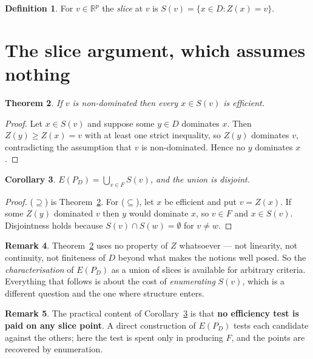 \documentclass[11pt,a4paper]{article}
\newcommand{\Dset}{D}
\newcommand{\E}{E(P_{\Dset})}
\newcommand{\Z}{Z}
\newcommand{\R}{\mathbb{R}}
\theoremstyle{plain}
\newtheorem{theorem}{Theorem}
\newtheorem{corollary}[theorem]{Corollary}
\theoremstyle{definition}
\newtheorem{definition}[theorem]{Definition}
\newtheorem{remark}[theorem]{Remark}
\begin{document}
\begin{definition}
For $v \in \R^p$ the \emph{slice} at $v$ is
$S(v) = \{x \in \Dset : \Z(x) = v\}$.
\end{definition}

\section{The slice argument, which assumes nothing}

\begin{theorem}\label{th:slice}
If $v$ is non-dominated then every $x \in S(v)$ is efficient.
\end{theorem}

\begin{proof}
Let $x \in S(v)$ and suppose some $y \in \Dset$ dominates $x$.  Then
$\Z(y) \geqslant \Z(x) = v$ with at least one strict inequality, so $\Z(y)$
dominates $v$, contradicting the assumption that $v$ is non-dominated.  Hence
no $y$ dominates $x$.
\end{proof}

\begin{corollary}\label{cor:union}
$\displaystyle \E = \bigcup_{v \in F} S(v)$, and the union is disjoint.
\end{corollary}

\begin{proof}
($\supseteq$) is Theorem~\ref{th:slice}.  For ($\subseteq$), let $x$ be
efficient and put $v = \Z(x)$.  If some $\Z(y)$ dominated $v$ then $y$ would
dominate $x$, so $v \in F$ and $x \in S(v)$.  Disjointness holds because
$S(v) \cap S(w) = \emptyset$ for $v \neq w$.
\end{proof}

\begin{remark}
Theorem~\ref{th:slice} uses no property of $\Z$ whatsoever --- not linearity,
not continuity, not finiteness of $\Dset$ beyond what makes the notions
well posed.  So the \emph{characterisation} of $\E$ as a union of slices is
available for arbitrary criteria.  Everything that follows is about the cost of
\emph{enumerating} $S(v)$, which is a different question and the one where
structure enters.
\end{remark}

\begin{remark}\label{rem:cost}
The practical content of Corollary~\ref{cor:union} is that \textbf{no
efficiency test is paid on any slice point}.  A direct construction of $\E$
tests each candidate against the others; here the test is spent only in
producing $F$, and the points are recovered by enumeration.
\end{remark}
\end{document}
